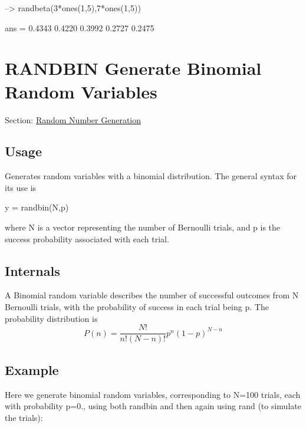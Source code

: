 \begin{DoxyVerbInclude}
--> randbeta(3*ones(1,5),7*ones(1,5))

ans = 
    0.4343    0.4220    0.3992    0.2727    0.2475 
\end{DoxyVerbInclude}
 \hypertarget{random_randbin}{}\section{R\-A\-N\-D\-B\-I\-N Generate Binomial Random Variables}\label{random_randbin}
Section\-: \hyperlink{sec_random}{Random Number Generation} \hypertarget{vtkwidgets_vtkxyplotwidget_Usage}{}\subsection{Usage}\label{vtkwidgets_vtkxyplotwidget_Usage}
Generates random variables with a binomial distribution. The general syntax for its use is \begin{DoxyVerb}   y = randbin(N,p)
\end{DoxyVerb}
 where {\ttfamily N} is a vector representing the number of Bernoulli trials, and {\ttfamily p} is the success probability associated with each trial. \hypertarget{transforms_svd_Function}{}\subsection{Internals}\label{transforms_svd_Function}
A Binomial random variable describes the number of successful outcomes from {\ttfamily N} Bernoulli trials, with the probability of success in each trial being {\ttfamily p}. The probability distribution is \[ P(n) = \frac{N!}{n!(N-n)!}p^n(1-p)^{N-n} \] \hypertarget{variables_struct_Example}{}\subsection{Example}\label{variables_struct_Example}
Here we generate {} binomial random variables, corresponding to {\ttfamily N=100} trials, each with probability {\ttfamily p=0.}, using both {\ttfamily randbin} and then again using {\ttfamily rand} (to simulate the trials)\-:


